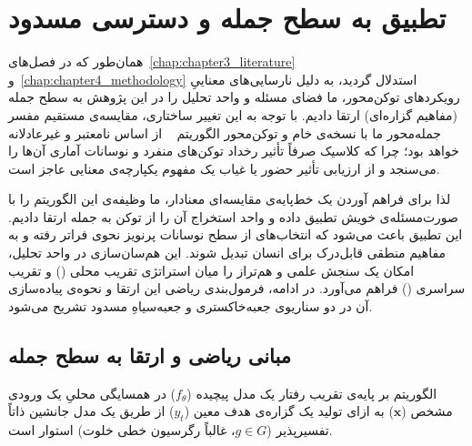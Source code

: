 
\section{تطبیق  به سطح جمله و دسترسی مسدود}\label{app:appendix_lime_adaptation}

همان‌طور که در فصل‌های~\ref{chap:chapter3_literature} و~\ref{chap:chapter4_methodology} استدلال گردید، به دلیل نارسایی‌های معناییِ رویکردهای توکن‌محور، ما فضای مسئله و واحد تحلیل را در این پژوهش به سطح جمله (مفاهیم گزاره‌ای) ارتقا دادیم. با توجه به این تغییر ساختاری، مقایسه‌ی مستقیم مفسر جمله‌محور ما با نسخه‌ی خام و توکن‌محور الگوریتم ~\cite{ribeiro2016lime} از اساس نامعتبر و غیرعادلانه خواهد بود؛ چرا که  کلاسیک صرفاً تأثیر رخداد توکن‌های منفرد و نوسانات آماری آن‌ها را می‌سنجد و از ارزیابی تأثیر حضور یا غیاب یک مفهوم یکپارچه‌ی معنایی عاجز است.

لذا برای فراهم آوردن یک خط‌پایه‌ی مقایسه‌ای معنادار، ما وظیفه‌ی این الگوریتم را با صورت‌مسئله‌ی خویش تطبیق داده و واحد استخراج آن را از توکن به جمله ارتقا دادیم. این تطبیق باعث می‌شود که انتخاب‌های  از سطح نوسانات پرنویز نحوی فراتر رفته و به مفاهیم منطقی قابل‌درک برای انسان تبدیل شوند. این هم‌سان‌سازی در واحد تحلیل، امکان یک سنجش علمی و هم‌تراز را میان استراتژی تقریب محلی () و تقریب سراسری () فراهم می‌آورد. در ادامه، فرمول‌بندی ریاضی این ارتقا و نحوه‌ی پیاده‌سازی آن در دو سناریوی جعبه‌خاکستری و جعبه‌سیاهِ مسدود تشریح می‌شود.


\subsection{مبانی ریاضی  و ارتقا به سطح جمله}\label{app:lime_formulation}

الگوریتم  بر پایه‌ی تقریب رفتار یک مدل پیچیده ($f_\theta$) در همسایگی محلیِ یک ورودی مشخص ($\mathbf{x}$) به ازای تولید یک گزاره‌ی هدف معین ($y_t$) از طریق یک مدل جانشین ذاتاً تفسیرپذیر ($g \in G$، غالباً رگرسیون خطی خلوت) استوار است.

